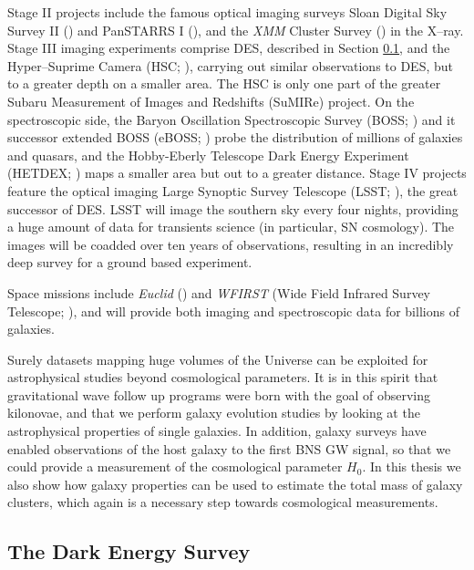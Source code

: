 Stage II projects include the famous optical imaging surveys Sloan Digital Sky Survey II (\citealt{sdssII}) and PanSTARRS I (\citealt{panstarss1}), and the \emph{XMM} Cluster Survey (\citealt{romer}) in the X--ray. Stage III imaging experiments comprise DES, described in Section \ref{sec:DES}, and the Hyper--Suprime Camera (HSC; \citealt{hsc}), carrying out similar observations to DES, but to a greater depth on a smaller area. The HSC is only one part of the greater Subaru Measurement of Images and Redshifts (SuMIRe) project. On the spectroscopic side, the Baryon Oscillation Spectroscopic Survey (BOSS; \citealt{boss}) and it successor extended BOSS (eBOSS; \citealt{eboss}) probe the distribution of millions of galaxies and quasars, and the Hobby-Eberly Telescope Dark Energy Experiment (HETDEX; \citealt{hetdex}) maps a smaller area but out to a greater distance. Stage IV projects feature the optical imaging Large Synoptic Survey Telescope (LSST; \citealt{lsst}), the great successor of DES. LSST will image the southern sky every four nights, providing a huge amount of data for transients science (in particular, SN cosmology). The images will be coadded over ten years of observations, resulting in an incredibly deep survey for a ground based experiment.

Space missions include \emph{Euclid} (\citealt{euclid}) and \emph{WFIRST} (Wide Field Infrared Survey Telescope; \citealt{wfirst}), and will provide both imaging and spectroscopic data for billions of galaxies.

Surely datasets mapping huge volumes of the Universe can be exploited for astrophysical studies beyond cosmological parameters. It is in this spirit that gravitational wave follow up programs were born with the goal of observing kilonovae, and that we perform galaxy evolution studies by looking at the astrophysical properties of single galaxies. In addition, galaxy surveys have enabled observations of the host galaxy to the first BNS GW signal, so that we could provide a measurement of the cosmological parameter $H_0$. In this thesis we also show how galaxy properties can be used to estimate the total mass of galaxy clusters, which again is a necessary step towards cosmological measurements.


\subsection{The Dark Energy Survey}\label{sec:DES}

